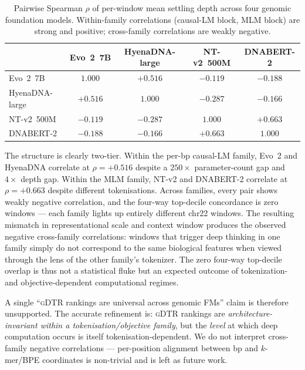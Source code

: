 \documentclass[12pt]{article}
\renewenvironment{table*}{\begin{table}}{\end{table}}
\theoremstyle{plain}
\theoremstyle{definition}
\theoremstyle{remark}
\newcommand{\gDTR}{\textsc{gDTR}}
\begin{document}
\begin{table}[t]
\caption{Pairwise Spearman $\rho$ of per-window mean settling depth
across four genomic foundation models. Within-family correlations
(causal-LM block, MLM block) are strong and positive; cross-family
correlations are weakly negative.}
\label{tab:cross-arch}
\centering
\small
\begin{tabular}{@{}lcccc@{}}
\toprule
 & Evo~2~7B & HyenaDNA-large & NT-v2~500M & DNABERT-2 \\
\midrule
Evo~2~7B         & $1.000$ & $+0.516$ & $-0.119$ & $-0.188$ \\
HyenaDNA-large   & $+0.516$ & $1.000$ & $-0.287$ & $-0.166$ \\
NT-v2~500M       & $-0.119$ & $-0.287$ & $1.000$ & $+0.663$ \\
DNABERT-2        & $-0.188$ & $-0.166$ & $+0.663$ & $1.000$ \\
\bottomrule
\end{tabular}
\end{table}

The structure is clearly two-tier. Within the per-bp causal-LM family,
Evo~2 and HyenaDNA correlate at $\rho=+0.516$ despite a $250\times$
parameter-count gap and $4\times$ depth gap. Within the MLM family,
NT-v2 and DNABERT-2 correlate at $\rho=+0.663$ despite different
tokenisations. Across families, every pair shows weakly negative
correlation, and the four-way top-decile concordance is zero windows
--- each family lights up entirely different chr22 windows. The
resulting mismatch in representational scale and context window
produces the observed negative cross-family correlations: windows that
trigger deep thinking in one family simply do not correspond to the
same biological features when viewed through the lens of the other
family's tokenizer. The zero four-way top-decile overlap is thus not a
statistical fluke but an expected outcome of tokenization- and
objective-dependent computational regimes.

A single ``\gDTR{} rankings are universal across genomic FMs'' claim
is therefore unsupported. The accurate refinement is: \gDTR{} rankings
are \emph{architecture-invariant within a tokenisation/objective
family}, but the \emph{level} at which deep computation occurs is
itself tokenisation-dependent. We do not interpret cross-family
negative correlations --- per-position alignment between bp and
$k$-mer/BPE coordinates is non-trivial and is left as future work.
\end{document}
